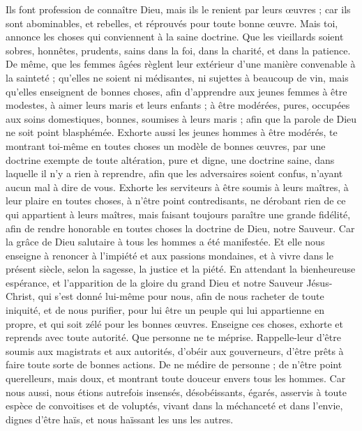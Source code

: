 \begin{multicols}{2}
Ils font profession de connaître Dieu, mais ils le renient par leurs œuvres ; car ils sont abominables, et rebelles, et réprouvés pour toute bonne œuvre.
\VerseOne{}Mais toi, annonce les choses qui conviennent à la saine doctrine.
Que les vieillards soient sobres, honnêtes, prudents, sains dans la foi, dans la charité, et dans la patience.
De même, que les femmes âgées règlent leur extérieur d'une manière convenable à la sainteté ; qu'elles ne soient ni médisantes, ni sujettes à beaucoup de vin, mais qu'elles enseignent de bonnes choses,
afin d’apprendre aux jeunes femmes à être modestes, à aimer leurs maris et leurs enfants ;
à être modérées, pures, occupées aux soins domestiques, bonnes, soumises à leurs maris ; afin que la parole de Dieu ne soit point blasphémée.
Exhorte aussi les jeunes hommes à être modérés,
te montrant toi-même en toutes choses un modèle de bonnes œuvres, par une doctrine exempte de toute altération, pure et digne,
une doctrine saine, dans laquelle il n’y a rien à reprendre, afin que les adversaires soient confus, n'ayant aucun mal à dire de vous.
Exhorte les serviteurs à être soumis à leurs maîtres, à leur plaire en toutes choses, à n’être point contredisants,
ne dérobant rien de ce qui appartient à leurs maîtres, mais faisant toujours paraître une grande fidélité, afin de rendre honorable en toutes choses la doctrine de Dieu, notre Sauveur.
Car la grâce de Dieu salutaire à tous les hommes a été manifestée.
Et elle nous enseigne à renoncer à l'impiété et aux passions mondaines, et à vivre dans le présent siècle, selon la sagesse, la justice et la piété.
En attendant la bienheureuse espérance, et l'apparition de la gloire du grand Dieu et notre Sauveur Jésus-Christ,
qui s'est donné lui-même pour nous, afin de nous racheter de toute iniquité, et de nous purifier, pour lui être un peuple qui lui appartienne en propre, et qui soit zélé pour les bonnes œuvres.
Enseigne ces choses, exhorte et reprends avec toute autorité. Que personne ne te méprise.
\VerseOne{}Rappelle-leur d'être soumis aux magistrats et aux autorités, d'obéir aux gouverneurs, d'être prêts à faire toute sorte de bonnes actions.
De ne médire de personne ; de n'être point querelleurs, mais doux, et montrant toute douceur envers tous les hommes.
Car nous aussi, nous étions autrefois insensés, désobéissants, égarés, asservis à toute espèce de convoitises et de voluptés, vivant dans la méchanceté et dans l’envie, dignes d’être haïs, et nous haïssant les uns les autres.

\end{multicols}
